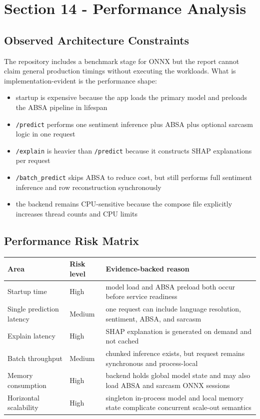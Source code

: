 \section{Section 14 - Performance Analysis}
\subsection{Observed Architecture Constraints}
The repository includes a benchmark stage for ONNX but the report cannot claim general production timings without executing the workloads. What is implementation-evident is the performance shape:
\begin{itemize}[leftmargin=1.2em]
  \item startup is expensive because the app loads the primary model and preloads the ABSA pipeline in lifespan
  \item \texttt{/predict} performs one sentiment inference plus ABSA plus optional sarcasm logic in one request
  \item \texttt{/explain} is heavier than \texttt{/predict} because it constructs SHAP explanations per request
  \item \texttt{/batch\_predict} skips ABSA to reduce cost, but still performs full sentiment inference and row reconstruction synchronously
  \item the backend remains CPU-sensitive because the compose file explicitly increases thread counts and CPU limits
\end{itemize}

\subsection{Performance Risk Matrix}
\begin{table}[H]
\centering
\begin{tabularx}{\textwidth}{@{}l l X@{}}
\toprule
\textbf{Area} & \textbf{Risk level} & \textbf{Evidence-backed reason} \\
\midrule
Startup time & High & model load and ABSA preload both occur before service readiness \\
Single prediction latency & Medium & one request can include language resolution, sentiment, ABSA, and sarcasm \\
Explain latency & High & SHAP explanation is generated on demand and not cached \\
Batch throughput & Medium & chunked inference exists, but request remains synchronous and process-local \\
Memory consumption & High & backend holds global model state and may also load ABSA and sarcasm ONNX sessions \\
Horizontal scalability & High & singleton in-process model and local memory state complicate concurrent scale-out semantics \\
\bottomrule
\end{tabularx}
\end{table}

